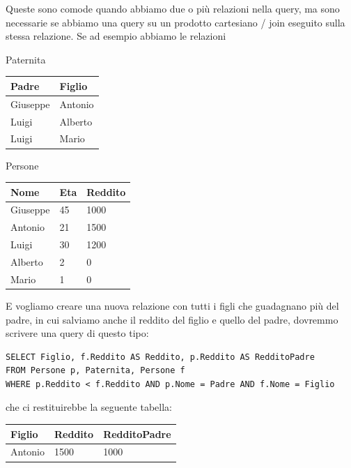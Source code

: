 \documentclass[11pt, a4paper, titlepage, oneside]{scrbook}
\begin{document}
Queste sono comode quando abbiamo due o più relazioni nella query, ma sono necessarie se abbiamo una query su un prodotto cartesiano / join eseguito sulla stessa relazione. Se ad esempio abbiamo le relazioni


\begin{minipage}[c]{0.45\textwidth}
\begin{center}
    Paternita

\begin{tabular}{|l|l|}
\hline
\textbf{Padre} & \textbf{Figlio} \\ \hline
Giuseppe & Antonio \\
Luigi & Alberto \\
Luigi & Mario  \\ \hline
\end{tabular}
\end{center}
\end{minipage}\hfill
\begin{minipage}[c]{0.45\textwidth}
\begin{center}
    Persone

\begin{tabular}{|l|l|l|}
\hline
\textbf{Nome} & \textbf{Eta} & \textbf{Reddito} \\ \hline
Giuseppe & 45 & 1000 \\
Antonio & 21 & 1500 \\
Luigi & 30 & 1200 \\
Alberto & 2 & 0 \\
Mario & 1 & 0 \\ \hline
\end{tabular}
\end{center}
\end{minipage}

E vogliamo creare una nuova relazione con tutti i figli che guadagnano più del padre, in cui salviamo anche il reddito del figlio e quello del padre, dovremmo scrivere una query di questo tipo:

\begin{lstlisting}
SELECT Figlio, f.Reddito AS Reddito, p.Reddito AS RedditoPadre
FROM Persone p, Paternita, Persone f
WHERE p.Reddito < f.Reddito AND p.Nome = Padre AND f.Nome = Figlio
\end{lstlisting}

che ci restituirebbe la seguente tabella:

\begin{center}
\begin{tabular}{|l|l|l|}
\hline
\textbf{Figlio} & \textbf{Reddito} & \textbf{RedditoPadre} \\ \hline
Antonio & 1500 & 1000 \\ \hline
\end{tabular}
\end{center}
\end{document}
